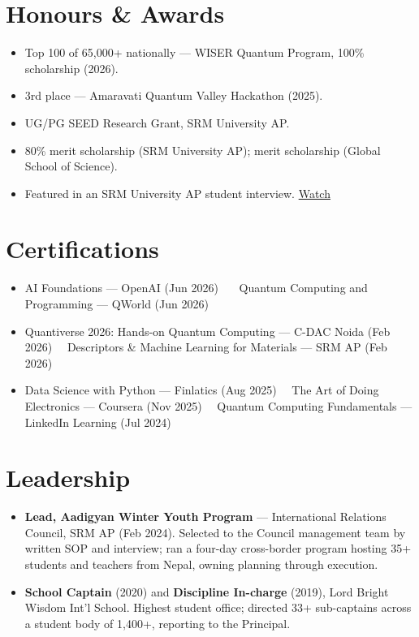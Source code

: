 \documentclass[a4paper,10pt]{article}
\begin{document}
\section*{Honours \& Awards}
\begin{itemize}
    \item Top 100 of 65,000+ nationally --- WISER Quantum Program, 100\% scholarship (2026).
    \item 3rd place --- Amaravati Quantum Valley Hackathon (2025).
    \item UG/PG SEED Research Grant, SRM University AP.
    \item 80\% merit scholarship (SRM University AP); merit scholarship (Global School of Science).
    \item Featured in an SRM University AP student interview. \href{https://www.youtube.com/watch?v=hVELZ_He_Oc}{Watch}
\end{itemize}

\section*{Certifications}
\begin{itemize}
    \item AI Foundations --- OpenAI (Jun 2026) \ \textbullet\ \ Quantum Computing and Programming --- QWorld (Jun 2026)
    \item Quantiverse 2026: Hands-on Quantum Computing --- C-DAC Noida (Feb 2026) \ \textbullet\
          Descriptors \& Machine Learning for Materials --- SRM AP (Feb 2026)
    \item Data Science with Python --- Finlatics (Aug 2025) \ \textbullet\
          The Art of Doing Electronics --- Coursera (Nov 2025) \ \textbullet\
          Quantum Computing Fundamentals --- LinkedIn Learning (Jul 2024)
\end{itemize}

\section*{Leadership}
\begin{itemize}
    \item \textbf{Lead, Aadigyan Winter Youth Program} --- International Relations Council, SRM AP (Feb 2024).
          Selected to the Council management team by written SOP and interview; ran a four-day cross-border program
          hosting 35+ students and teachers from Nepal, owning planning through execution.
    \item \textbf{School Captain} (2020) and \textbf{Discipline In-charge} (2019), Lord Bright Wisdom Int'l School.
          Highest student office; directed 33+ sub-captains across a student body of 1,400+, reporting to the Principal.
\end{itemize}
\end{document}
